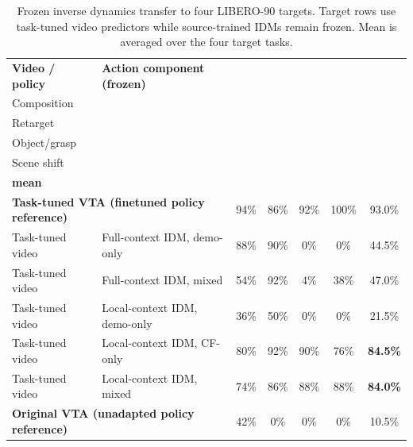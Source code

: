 \begin{table}[t]
    \centering
    \caption{
    Frozen inverse dynamics transfer to four LIBERO-90 targets.
    Target rows use task-tuned video predictors while source-trained IDMs
    remain frozen. Mean is averaged over the four target tasks.
    }
    \label{tab:component-transfer}
    \small
    \setlength{\tabcolsep}{5pt}
    \begin{tabular}{@{}llccccc@{}}
        \toprule
        \textbf{Video / policy}
        & \textbf{Action component (frozen)}
        & \shortstack{\textbf{64}\\Composition}
        & \shortstack{\textbf{74}\\Retarget}
        & \shortstack{\textbf{21}\\Object/grasp}
        & \shortstack{\textbf{45}\\Scene shift}
        & \shortstack{\textbf{Transfer}\\\textbf{mean}} \\
        \midrule

        \multicolumn{2}{l}{
            \textbf{Task-tuned VTA (finetuned policy reference)}
        }
        & 94\%
        & 86\%
        & 92\%
        & 100\%
        & 93.0\% \\

        \midrule

        Task-tuned video
        & Full-context IDM, demo-only
        & 88\%
        & 90\%
        & 0\%
        & 0\%
        & 44.5\% \\

        Task-tuned video
        & Full-context IDM, mixed
        & 54\%
        & 92\%
        & 4\%
        & 38\%
        & 47.0\% \\

        \midrule

        Task-tuned video
        & Local-context IDM, demo-only
        & 36\%
        & 50\%
        & 0\%
        & 0\%
        & 21.5\% \\

        Task-tuned video
        & Local-context IDM, CF-only
        & 80\%
        & 92\%
        & 90\%
        & 76\%
        & \textbf{84.5\%} \\

        Task-tuned video
        & Local-context IDM, mixed
        & 74\%
        & 86\%
        & 88\%
        & 88\%
        & \textbf{84.0\%} \\

        \midrule

        \multicolumn{2}{l}{
            \textbf{Original VTA (unadapted policy reference)}
        }
        & 42\%
        & 0\%
        & 0\%
        & 0\%
        & 10.5\% \\

        \bottomrule
    \end{tabular}
    \vspace{-0.1in}
\end{table}

